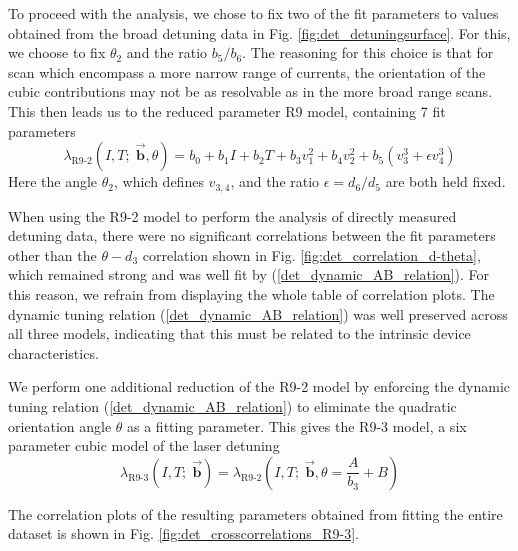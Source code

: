 \documentclass[12pt]{report}
\begin{document}
	To proceed with the analysis, we chose to fix two of the fit parameters to values obtained from the broad detuning data in Fig. \ref{fig:det_detuningsurface}. For this, we choose to fix $\theta_2$ and the ratio $b_5 / b_6$. The reasoning for this choice is that for scan which encompass a more narrow range of currents, the orientation of the cubic contributions may not be as resolvable as in the more broad range scans. This then leads us to the reduced parameter R9 model, containing 7 fit parameters
	\begin{equation}
		\lambda_\mathrm{R9\text{-}2}(I, T;\; \vec{\textbf{b}},\theta) = b_0 + b_1 I + b_2 T + b_3 v_1^2 + b_4 v_2^2 + b_5( v_3^3 + \epsilon v_4^3 )
	\end{equation}
	Here the angle $\theta_2$, which defines $v_{3,4}$, and the ratio $\epsilon = d_6 / d_5$ are both held fixed.
	
	When using the R9-2 model to perform the analysis of directly measured detuning data, there were no significant correlations between the fit parameters other than the $\theta-d_3$ correlation shown in Fig. \ref{fig:det_correlation_d-theta}, which remained strong and was well fit by (\ref{det_dynamic_AB_relation}). For this reason, we refrain from displaying the whole table of correlation plots. The dynamic tuning relation (\ref{det_dynamic_AB_relation}) was well preserved across all three models, indicating that this must be related to the intrinsic device characteristics.
	
	We perform one additional reduction of the R9-2 model by enforcing the dynamic tuning relation (\ref{det_dynamic_AB_relation}) to eliminate the quadratic orientation angle $\theta$ as a fitting parameter. This gives the R9-3 model, a six parameter cubic model of the laser detuning
	\begin{equation}
		\lambda_\mathrm{R9\text{-}3}(I, T;\; \vec{\textbf{b}}) = \lambda_\mathrm{R9\text{-}2}\left(I, T;\; \vec{\textbf{b}},\theta = \frac{A}{b_3} + B\right)
	\end{equation}
	
	The correlation plots of the resulting parameters obtained from fitting the entire dataset is shown in Fig. \ref{fig:det_crosscorrelations_R9-3}.
	
	
\end{document}
